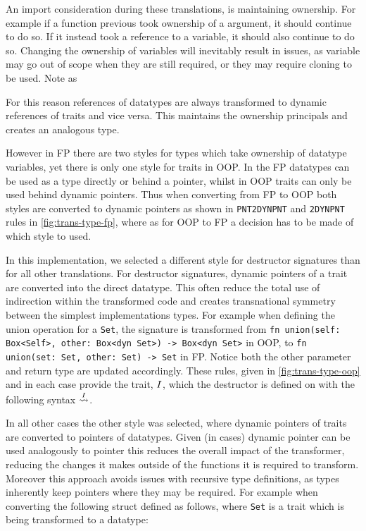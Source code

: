 \documentclass[ oneside,%
                    author={James Elgar},
                    degree={MEng},
                     title={Bidirectional transformer between functional and \\ object-oriented programming in Rust},
                  subtitle={}]{dissertation}
\newcommand{\rust}[1]{\texttt{#1}}
\begin{document}
An import consideration during these translations, is maintaining ownership. For example if a function previous took ownership of a argument, it should continue to do so. If it instead took a reference to a variable, it should also continue to do so. Changing the ownership of variables will inevitably result in issues, as variable may go out of scope when they are still required, or they may require cloning to be used. Note as 

For this reason references of datatypes are always transformed to dynamic references of traits and vice versa. This maintains the ownership principals and creates an analogous type.

However in FP there are two styles for types which take ownership of datatype variables, yet there is only one style for traits in OOP. In the FP datatypes can be used as a type directly or behind a pointer, whilst in OOP traits can only be used behind dynamic pointers. Thus when converting from FP to OOP both styles are converted to dynamic pointers as shown in \verb|PNT2DYNPNT| and \verb|2DYNPNT| rules in \autoref{fig:trans-type-fp}, where as for OOP to FP a decision has to be made of which style to used.

In this implementation, we selected a different style for destructor signatures than for all other translations. For destructor signatures, dynamic pointers of a trait are converted into the direct datatype. This often reduce the total use of indirection within the transformed code and creates transnational symmetry between the simplest implementations types. For example when defining the union operation for a \rust{Set}, the signature is transformed from \rust{fn union(self: Box<Self>, other: Box<dyn Set>) -> Box<dyn Set>} in OOP, to \rust{fn union(set: Set, other: Set) -> Set} in FP. Notice both the other parameter and return type are updated accordingly. These rules, given in \autoref{fig:trans-type-oop} and in each case provide the trait, $I$, which the destructor is defined on with the following syntax $\overset{I}{\leadsto}$.

In all other cases the other style was selected, where dynamic pointers of traits are converted to pointers of datatypes. Given (in cases) dynamic pointer can be used analogously to pointer this reduces the overall impact of the transformer, reducing the changes it makes outside of the functions it is required to transform. Moreover this approach avoids issues with recursive type definitions, as types inherently keep pointers where they may be required. For example when converting the following struct defined as follows, where \rust{Set} is a trait which is being transformed to a datatype:
\end{document}
